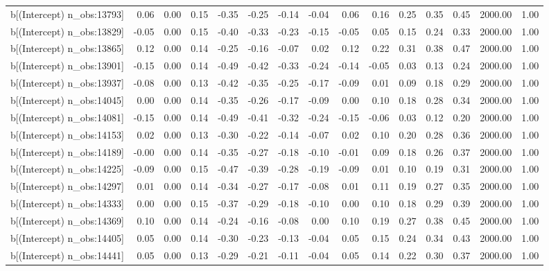 \begin{table}[ht]
\begin{tabular}{rrrrrrrrrrrrrrr}
  b[(Intercept) n\_obs:13793] & 0.06 & 0.00 & 0.15 & -0.35 & -0.25 & -0.14 & -0.04 & 0.06 & 0.16 & 0.25 & 0.35 & 0.45 & 2000.00 & 1.00 \\ 
  b[(Intercept) n\_obs:13829] & -0.05 & 0.00 & 0.15 & -0.40 & -0.33 & -0.23 & -0.15 & -0.05 & 0.05 & 0.15 & 0.24 & 0.33 & 2000.00 & 1.00 \\ 
  b[(Intercept) n\_obs:13865] & 0.12 & 0.00 & 0.14 & -0.25 & -0.16 & -0.07 & 0.02 & 0.12 & 0.22 & 0.31 & 0.38 & 0.47 & 2000.00 & 1.00 \\ 
  b[(Intercept) n\_obs:13901] & -0.15 & 0.00 & 0.14 & -0.49 & -0.42 & -0.33 & -0.24 & -0.14 & -0.05 & 0.03 & 0.13 & 0.24 & 2000.00 & 1.00 \\ 
  b[(Intercept) n\_obs:13937] & -0.08 & 0.00 & 0.13 & -0.42 & -0.35 & -0.25 & -0.17 & -0.09 & 0.01 & 0.09 & 0.18 & 0.29 & 2000.00 & 1.00 \\ 
  b[(Intercept) n\_obs:14045] & 0.00 & 0.00 & 0.14 & -0.35 & -0.26 & -0.17 & -0.09 & 0.00 & 0.10 & 0.18 & 0.28 & 0.34 & 2000.00 & 1.00 \\ 
  b[(Intercept) n\_obs:14081] & -0.15 & 0.00 & 0.14 & -0.49 & -0.41 & -0.32 & -0.24 & -0.15 & -0.06 & 0.03 & 0.12 & 0.20 & 2000.00 & 1.00 \\ 
  b[(Intercept) n\_obs:14153] & 0.02 & 0.00 & 0.13 & -0.30 & -0.22 & -0.14 & -0.07 & 0.02 & 0.10 & 0.20 & 0.28 & 0.36 & 2000.00 & 1.00 \\ 
  b[(Intercept) n\_obs:14189] & -0.00 & 0.00 & 0.14 & -0.35 & -0.27 & -0.18 & -0.10 & -0.01 & 0.09 & 0.18 & 0.26 & 0.37 & 2000.00 & 1.00 \\ 
  b[(Intercept) n\_obs:14225] & -0.09 & 0.00 & 0.15 & -0.47 & -0.39 & -0.28 & -0.19 & -0.09 & 0.01 & 0.10 & 0.19 & 0.31 & 2000.00 & 1.00 \\ 
  b[(Intercept) n\_obs:14297] & 0.01 & 0.00 & 0.14 & -0.34 & -0.27 & -0.17 & -0.08 & 0.01 & 0.11 & 0.19 & 0.27 & 0.35 & 2000.00 & 1.00 \\ 
  b[(Intercept) n\_obs:14333] & 0.00 & 0.00 & 0.15 & -0.37 & -0.29 & -0.18 & -0.10 & 0.00 & 0.10 & 0.18 & 0.29 & 0.39 & 2000.00 & 1.00 \\ 
  b[(Intercept) n\_obs:14369] & 0.10 & 0.00 & 0.14 & -0.24 & -0.16 & -0.08 & 0.00 & 0.10 & 0.19 & 0.27 & 0.38 & 0.45 & 2000.00 & 1.00 \\ 
  b[(Intercept) n\_obs:14405] & 0.05 & 0.00 & 0.14 & -0.30 & -0.23 & -0.13 & -0.04 & 0.05 & 0.15 & 0.24 & 0.34 & 0.43 & 2000.00 & 1.00 \\ 
  b[(Intercept) n\_obs:14441] & 0.05 & 0.00 & 0.13 & -0.29 & -0.21 & -0.11 & -0.04 & 0.05 & 0.14 & 0.22 & 0.30 & 0.37 & 2000.00 & 1.00 \\ 

\end{tabular}
\end{table}
